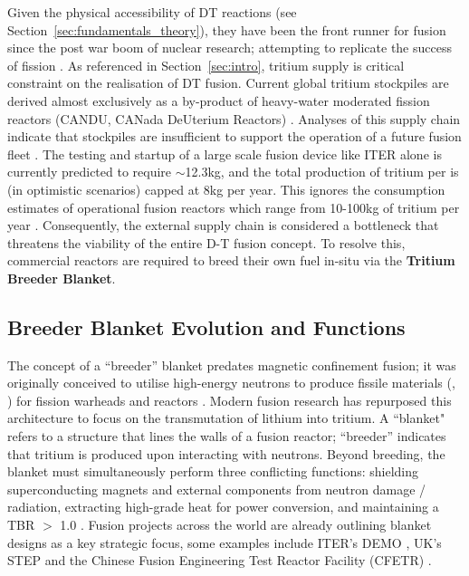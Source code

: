 \documentclass[12pt]{article}
\begin{document}
Given the physical accessibility of DT reactions (see Section~\ref{sec:fundamentals_theory}), they
have been the front runner for fusion since the post war boom of nuclear research; attempting to
replicate the success of fission \cite{paris_lost_2023}. As referenced in Section~\ref{sec:intro},
tritium supply is critical constraint on the realisation of DT fusion. Current global tritium
stockpiles are derived almost exclusively as a by-product of heavy-water moderated fission reactors
(CANDU, CANada DeUterium Reactors) \cite{kovari_tritium_2018}. Analyses of this supply chain
indicate that stockpiles are insufficient to support the operation of a future fusion fleet
\cite{kovari_tritium_2018, pearson_tritium_2018}. The testing and startup of a large scale fusion
device like ITER alone is currently predicted to require $\sim$12.3kg, and the total production of
tritium per is (in optimistic scenarios) capped at 8kg per year. This ignores the consumption
estimates of operational fusion reactors which range from 10-100kg of tritium per year
\cite{lord_fusing_2024}. Consequently, the external supply chain is considered a bottleneck that
threatens the viability of the entire D-T fusion concept. To resolve this, commercial reactors are
required to breed their own fuel in-situ via the \textbf{Tritium Breeder Blanket}.

\subsection{Breeder Blanket Evolution and Functions}
\label{sec:blanket_literature}

The concept of a ``breeder'' blanket predates magnetic confinement fusion; it was originally
conceived to utilise high-energy neutrons to produce fissile materials (, )
for fission warheads and reactors \cite{moir_fusion_1982, lee_us-doe_1983, maniscalco_fusion_1984}.
Modern fusion research has repurposed this architecture to focus on the transmutation of lithium
into tritium. A ``blanket" refers to a structure that lines the walls of a fusion reactor;
``breeder'' indicates that tritium is produced upon interacting with neutrons. Beyond breeding, the
blanket must simultaneously perform three conflicting functions: shielding superconducting magnets
and external components from neutron damage / radiation, extracting high-grade heat for power
conversion, and maintaining a TBR $>$ 1.0 \cite{shatalov_breeder_1991}.
Fusion projects across the world are already outlining blanket designs as a key strategic focus,
some examples include ITER's DEMO \cite{federici_overview_2019}, UK's STEP \cite{lord_fusing_2024}
and the Chinese Fusion Engineering Test Reactor Facility (CFETR) \cite{liu_design_2022}.
\end{document}
